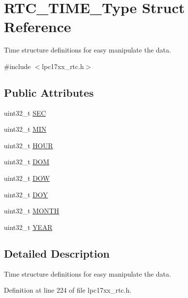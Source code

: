 \hypertarget{struct_r_t_c___t_i_m_e___type}{\section{\-R\-T\-C\-\_\-\-T\-I\-M\-E\-\_\-\-Type \-Struct \-Reference}
\label{struct_r_t_c___t_i_m_e___type}
}


\-Time structure definitions for easy manipulate the data.  




{\ttfamily \#include $<$lpc17xx\-\_\-rtc.\-h$>$}

\subsection*{\-Public \-Attributes}
\begin{DoxyCompactItemize}
\item 
uint32\-\_\-t \hyperlink{struct_r_t_c___t_i_m_e___type_a4dcba39a8ca89d45793946d57c40caea}{\-S\-E\-C}
\item 
uint32\-\_\-t \hyperlink{struct_r_t_c___t_i_m_e___type_a0f2f73b9283a7f803225dc942ede894e}{\-M\-I\-N}
\item 
uint32\-\_\-t \hyperlink{struct_r_t_c___t_i_m_e___type_a259724d193eb9f05640e42d4b97f4aa8}{\-H\-O\-U\-R}
\item 
uint32\-\_\-t \hyperlink{struct_r_t_c___t_i_m_e___type_a3e4c78e76b051e7ddd130b69c8147023}{\-D\-O\-M}
\item 
uint32\-\_\-t \hyperlink{struct_r_t_c___t_i_m_e___type_ad74fb3c460145484ccc91db5bf7b29bc}{\-D\-O\-W}
\item 
uint32\-\_\-t \hyperlink{struct_r_t_c___t_i_m_e___type_a73fd691a18c0bfc5d811e5fa59a575eb}{\-D\-O\-Y}
\item 
uint32\-\_\-t \hyperlink{struct_r_t_c___t_i_m_e___type_a3dea6bb0300bf97de53dbca3a74b50d8}{\-M\-O\-N\-T\-H}
\item 
uint32\-\_\-t \hyperlink{struct_r_t_c___t_i_m_e___type_a81f7d3b93c2ef20925cf614f0efe4efe}{\-Y\-E\-A\-R}
\end{DoxyCompactItemize}


\subsection{\-Detailed \-Description}
\-Time structure definitions for easy manipulate the data. 

\-Definition at line 224 of file lpc17xx\-\_\-rtc.\-h.




